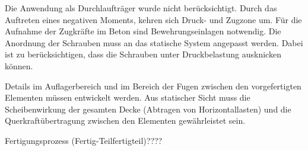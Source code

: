 Die Anwendung als Durchlaufträger wurde nicht berücksichtigt. Durch das Auftreten eines negativen Moments, kehren sich Druck- und Zugzone um. Für die Aufnahme der Zugkräfte im Beton sind Bewehrungseinlagen notwendig. Die Anordnung der Schrauben muss an das statische System angepasst werden. Dabei ist zu berücksichtigen, dass die Schrauben unter Druckbelastung ausknicken können.

Details im Auflagerbereich und im Bereich der Fugen zwischen den vorgefertigten Elementen müssen entwickelt werden. Aus statischer Sicht muss die Scheibenwirkung der gesamten Decke (Abtragen von Horizontallasten) und die Querkraftübertragung zwischen den Elementen gewährleistet sein.


Fertigungsprozess (Fertig-Teilfertigteil)???? 














	
	

